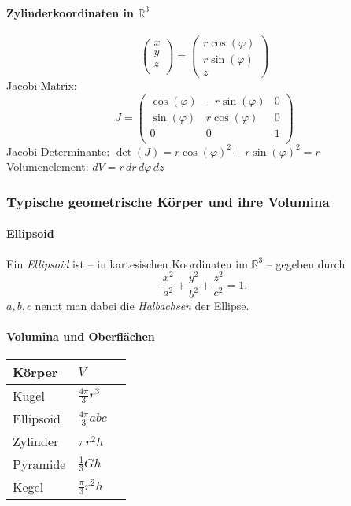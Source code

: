 \documentclass[a4paper, 9pt, DIV=24]{scrartcl}
\newcommand{\R}{\mathbb{R}}
\begin{document}
\paragraph{Zylinderkoordinaten in $\R^3$}
\[
\begin{pmatrix}
 x \\ y \\ z \\
\end{pmatrix}
=
\begin{pmatrix}
 r\cos(\varphi) \\
 r\sin(\varphi) \\
 z
\end{pmatrix}
\]
Jacobi-Matrix:
\[
J =
\begin{pmatrix}
 \cos(\varphi) & -r\sin(\varphi) & 0 \\
 \sin(\varphi) &  r\cos(\varphi) & 0 \\
 0 & 0 & 1 \\
\end{pmatrix}
\]
Jacobi-Determinante: $\det(J) = r\cos(\varphi)^2+r\sin(\varphi)^2 = r$\\
Volumenelement: $dV = r\, dr\, d\varphi\, dz$

\subsubsection{Typische geometrische Körper und ihre Volumina}
\paragraph{Ellipsoid}
Ein \emph{Ellipsoid} ist -- in kartesischen Koordinaten im $\R^3$ -- gegeben durch
\[ \frac{x^2}{a^2} + \frac{y^2}{b^2} + \frac{z^2}{c^2} = 1. \]
$a,b,c$ nennt man dabei die \emph{Halbachsen} der Ellipse.

\paragraph{Volumina und Oberflächen}

\begin{tabular}{lll}
 \textbf{Körper} & $V$ \\\hline
 Kugel & $\frac{4\pi}{3}r^3$ \\
 Ellipsoid & $\frac{4\pi}{3}abc$ \\
 Zylinder & $\pi r^2h$ \\
 Pyramide & $\frac{1}{3}Gh$ \\
 Kegel & $\frac{\pi}{3}r^2h$ \\
\end{tabular}
\end{document}

